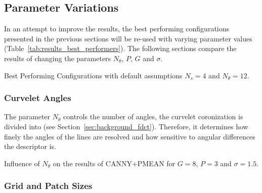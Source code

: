 \subsection{Parameter Variations}\label{sec:results_parameters}

In an attempt to improve the results, the best performing configurations
presented in the previous sections will be re-used with varying parameter
values (Table~\ref{tab:results_best_performers}). The following sections
compare the results of changing the parameters $N_{\theta}$, $P$, $G$ and
$\sigma$.

\begin{table}[h]
    \centering
    \resultsbestperformers
    \caption[Best Performing Configurations]{
        Best Performing Configurations with default assumptions $N_s=4$ and
        $N_{\theta}=12$.
    }
    \label{tab:results_best_performers}
\end{table}

\FloatBarrier
\subsubsection{Curvelet Angles}

The parameter $N_{\theta}$ controls the number of angles, the curvelet
coronization is divided into (see Section~\ref{sec:background_fdct}).
Therefore, it determines how finely the angles of the lines are resolved and
how sensitive to angular differences the descriptor is.

\begin{table}[h]
    \centering
    \resultsparameterangles
    \caption[Angle Parameter Results]{
        Influence of $N_{\theta}$ on the results of CANNY+PMEAN for $G=8$,
        $P=3$ and $\sigma=1.5$.
    }
    \label{tab:results_parameter_angles}
\end{table}

\FloatBarrier
\subsubsection{Grid and Patch Sizes}

